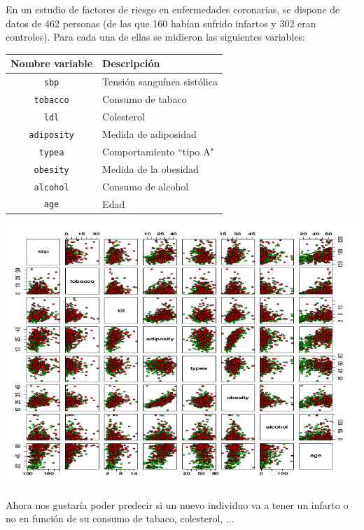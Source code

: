 \begin{example}
En un estudio de factores de riesgo en enfermedades coronarias, se dispone de datos de 462 personas (de las que 160 habían sufrido infartos y 302 eran controles). Para cada una de ellas se midieron las siguientes variables:


\begin{center}
\label{example:infartos}
{\scriptsize

\begin{tabular}{|c|l|}
\hline Nombre variable & Descripci\'{o}n  \\
\hline {\tt sbp} & Tensión sanguínea sistólica \\
{\tt tobacco} & Consumo de tabaco\\
{\tt ldl} & Colesterol\\
{\tt adiposity} & Medida de adiposidad\\
{\tt typea} & Comportamiento ``tipo A"\\
{\tt obesity} & Medida de la obesidad\\
{\tt alcohol} & Consumo de alcohol\\
{\tt age} & Edad \\
 \hline
 \end{tabular}

 }
\end{center}

\includegraphics[scale=0.5]{img/pairs-heart.png}


Ahora nos gustaría poder predecir si un nuevo individuo va a tener un infarto o no en función de su consumo de tabaco, colesterol, ...
\end{example}


